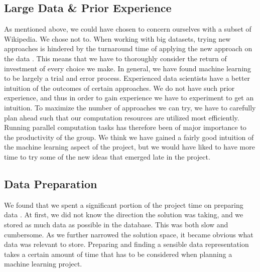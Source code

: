 \subsection{Large Data \& Prior Experience}
As mentioned above, we could have chosen to concern ourselves with a subset of Wikipedia. We chose not to. When working with big datasets, trying new approaches is hindered by the turnaround time of applying the new approach on the data . This means that we have to thoroughly consider the return of investment of every choice we make. In general, we have found machine learning to be largely a trial and error process. Experienced data scientists have a better intuition of the outcomes of certain approaches. We do not have such prior experience, and thus in order to gain experience we have to experiment to get an intuition. To maximize the number of approaches we can try, we have to carefully plan ahead such that our computation resources are utilized most efficiently. Running parallel computation tasks has therefore been of major importance to the productivity of the group. We think we have gained a fairly good intuition of the machine learning aspect of the project, but we would have liked to have more time to try some of the new ideas that emerged late in the project.  

\subsection{Data Preparation}
We found that we spent a significant portion of the project time on preparing data . At first, we did not know the direction the solution was taking, and we stored as much data as possible in the database. This was both slow and cumbersome. As we further narrowed the solution space, it became obvious what data was relevant to store. Preparing and finding a sensible data representation takes a certain amount of time that has to be considered when planning a machine learning project.

